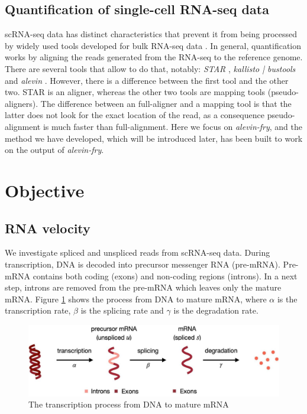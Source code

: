 \subsection{Quantification of single-cell RNA-seq data}
scRNA-seq data has distinct characteristics that prevent it from being processed by widely used tools developed for bulk RNA-seq data \citep{alevin_fry}. In general, quantification works by aligning the reads generated from the RNA-seq to the reference genome. There are several tools that allow to do that, notably: \emph{STAR} \citep{star}, \emph{kallisto | bustools} \citep{kallisto} and \emph{alevin} \citep{alevin}. However, there is a difference between the first tool and the other two. STAR is an aligner, whereas the other two tools are mapping tools (pseudo-aligners). The difference between an full-aligner and a mapping tool is that the latter does not look for the exact location of the read, as a consequence pseudo-alignment is much faster than full-alignment. Here we focus on \emph{alevin-fry}, and the method we have developed, which will be introduced later, has been built to work on the output of \emph{alevin-fry}.

\section{Objective}

\subsection{RNA velocity}
We investigate spliced and unspliced reads from scRNA-seq data. During transcription, DNA is decoded into precursor messenger RNA (pre-mRNA). Pre-mRNA contains both coding (exons) and non-coding regions (introns). In a next step, introns are removed from the pre-mRNA which leaves only the mature mRNA. Figure \ref{fig:RNA_VELO} shows the process from DNA to mature mRNA, where $\alpha$ is the transcription rate, $\beta$ is the splicing rate and $\gamma$ is the degradation rate.

\begin{figure}[!htb]
\begin{center}
\includegraphics{../figures/regulation.jpg}
\end{center}
\caption{The transcription process from DNA to mature mRNA \citep{rna_velo_traj}}
\label{fig:RNA_VELO}
\end{figure}
\FloatBarrier

